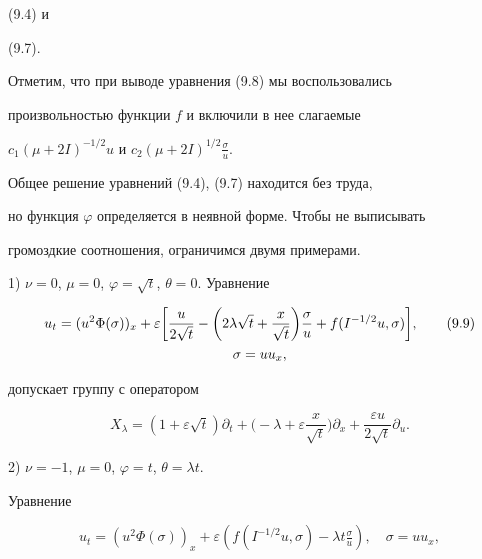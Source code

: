 (9.4) и 


(9.7). 


 


Отметим, что при выводе уравнения (9.8) мы воспользовались 


произвольностью функции $f$ и включили в нее слагаемые 


$c_1(\mu+2I)^{-1/2}u$ и $c_2(\mu+2I)^{1/2}\frac{\sigma}{u}$. 


 


Общее решение уравнений (9.4), (9.7) находится без труда, 


но функция $\varphi$ определяется в неявной форме. Чтобы не выписывать


громоздкие соотношения, ограничимся двумя примерами. 


 


1) $\nu=0$, $\mu=0$, $\varphi=\sqrt{t}$, $\theta=0$. Уравнение 


\begin{gather} 


u_t=(u^2\Phi(\sigma))_x+\varepsilon\bigg[ 


\frac{u}{2\sqrt{t}}-\bigg(2\lambda\sqrt{t}+ 


\frac{x}{\sqrt{t}}\bigg)\frac{\sigma}{u}+f 


(I^{-1/2}u,\sigma)\bigg],\tag{9.9}\\ 


\sigma=u u_x, \notag 


\end{gather} 


допускает группу с оператором 


\begin{equation} 


X_\lambda=(1+\varepsilon\sqrt{t})\partial _t+\bigg(-\lambda+ 


\varepsilon\frac{x}{\sqrt{t}}\bigg)\partial _x+ 


\frac{\varepsilon u}{2\sqrt{t}}\partial _u.\tag{9.10} 


\end{equation} 


 


2) $\nu=-1$, $\mu=0$, $\varphi=t$, $\theta=\lambda t$. 


Уравнение 


\begin{equation} 


u_t=(u^2\Phi(\sigma))_x+\varepsilon 


(f(I^{-1/2}u,\sigma)-\lambda t\tfrac{\sigma}{u}),\quad 


\sigma=u u_x, \tag{9.11} 


\end{equation} 



